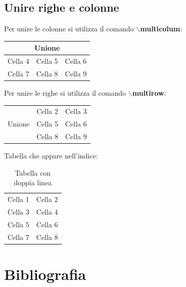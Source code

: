 \documentclass[a4paper,12pt,oneside]{book}
\theoremstyle{plain}
\begin{document}
	\section{Unire righe e colonne}
	Per unire le colonne si utilizza il comando \textbf{$\backslash$multicolum}:
	\begin{center}
		\begin{tabular}{| c | c | c |}
			\hline
			\multicolumn{3}{|c|}{Unione} \\
			\hline
			Cella 4 & Cella 5 & Cella 6\\
			\hline
			Cella 7 & Cella 8 & Cella 9\\
			\hline
		\end{tabular}
	\end{center}
	Per unire le righe si utilizza il comando \textbf{$\backslash$multirow}:
	\begin{center}
		\begin{tabular}{| c | c | c |}
			\hline
			\multirow{3}{4em}{Unione} & Cella 2 & Cella 3\\
			& Cella 5 & Cella 6\\
			& Cella 8 & Cella 9\\
			\hline
		\end{tabular}
	\end{center}
	\newpage
	Tabella che appare nell'indice:
	\begin{table}[h!]
		\centering
		\begin{tabular}{|| c | c ||}
			\hline
			Cella 1 & Cella 2\\
			Cella 3 & Cella 4\\
			Cella 5 & Cella 6\\
			Cella 7 & Cella 8\\
			\hline
		\end{tabular}
		\caption{Tabella con doppia linea}
		\label{tab:tabella}
	\end{table}
	
	
	
	\chapter{Bibliografia}
\end{document}
